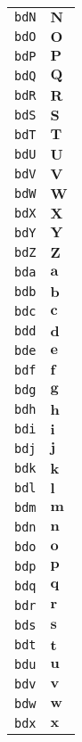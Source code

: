 \begin{longtable}{ll}
\texttt{bdN}&${}\textbf{N}{}$\\
\texttt{bdO}&${}\textbf{O}{}$\\
\texttt{bdP}&${}\textbf{P}{}$\\
\texttt{bdQ}&${}\textbf{Q}{}$\\
\texttt{bdR}&${}\textbf{R}{}$\\
\texttt{bdS}&${}\textbf{S}{}$\\
\texttt{bdT}&${}\textbf{T}{}$\\
\texttt{bdU}&${}\textbf{U}{}$\\
\texttt{bdV}&${}\textbf{V}{}$\\
\texttt{bdW}&${}\textbf{W}{}$\\
\texttt{bdX}&${}\textbf{X}{}$\\
\texttt{bdY}&${}\textbf{Y}{}$\\
\texttt{bdZ}&${}\textbf{Z}{}$\\
\texttt{bda}&${}\textbf{a}{}$\\
\texttt{bdb}&${}\textbf{b}{}$\\
\texttt{bdc}&${}\textbf{c}{}$\\
\texttt{bdd}&${}\textbf{d}{}$\\
\texttt{bde}&${}\textbf{e}{}$\\
\texttt{bdf}&${}\textbf{f}{}$\\
\texttt{bdg}&${}\textbf{g}{}$\\
\texttt{bdh}&${}\textbf{h}{}$\\
\texttt{bdi}&${}\textbf{i}{}$\\
\texttt{bdj}&${}\textbf{j}{}$\\
\texttt{bdk}&${}\textbf{k}{}$\\
\texttt{bdl}&${}\textbf{l}{}$\\
\texttt{bdm}&${}\textbf{m}{}$\\
\texttt{bdn}&${}\textbf{n}{}$\\
\texttt{bdo}&${}\textbf{o}{}$\\
\texttt{bdp}&${}\textbf{p}{}$\\
\texttt{bdq}&${}\textbf{q}{}$\\
\texttt{bdr}&${}\textbf{r}{}$\\
\texttt{bds}&${}\textbf{s}{}$\\
\texttt{bdt}&${}\textbf{t}{}$\\
\texttt{bdu}&${}\textbf{u}{}$\\
\texttt{bdv}&${}\textbf{v}{}$\\
\texttt{bdw}&${}\textbf{w}{}$\\
\texttt{bdx}&${}\textbf{x}{}$\\

\end{longtable}

